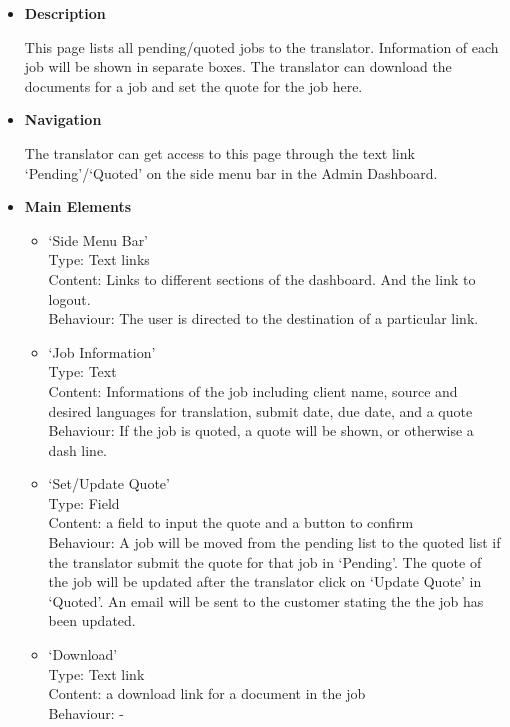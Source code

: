 \documentclass{l3proj}
\begin{document}
\begin{itemize}
\item \textbf{Description}

This page lists all pending/quoted jobs to the translator. Information of each job will be shown in separate boxes. 
The translator can download the documents for a job and set the quote for the job here.

\item \textbf{Navigation}

The translator can get access to this page through the text link `Pending'/`Quoted' on the side menu bar in the Admin Dashboard.

\item \textbf{Main Elements}
\begin{itemize}
\item `Side Menu Bar'\\
Type: Text links\\
Content: Links to different sections of the dashboard. And the link to logout. \\
Behaviour: The user is directed to the destination of a particular link. \\

\item `Job Information'\\
Type: Text\\
Content: Informations of the job including client name, source and desired languages for translation, submit date, due date, and a quote \\
Behaviour: If the job is quoted, a quote will be shown, or otherwise a dash line. \\

\item `Set/Update Quote'\\
Type: Field\\
Content: a field to input the quote and a button to confirm \\
Behaviour: A job will be moved from the pending list to the quoted list if the translator submit the quote for that job in `Pending'. The quote of the job will be updated after the translator click on `Update Quote' in `Quoted'. An email will be sent to the customer stating the the job has been updated.\\

\item `Download'\\
Type: Text link\\
Content: a download link for a document in the job\\
Behaviour: -\\
\end{itemize}
\end{itemize}
\end{document}
